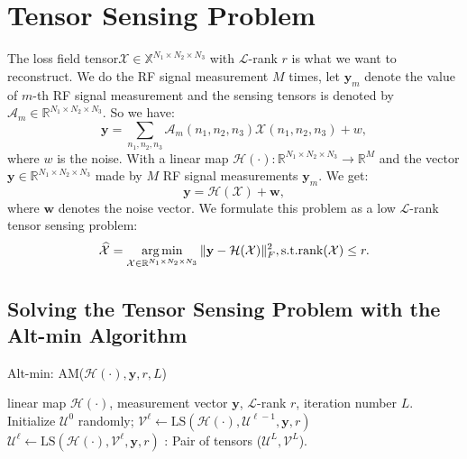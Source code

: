 \documentclass[journal,article,submit,moreauthors,pdftex,10pt,a4paper]{Definitions/mdpi}
\theoremstyle{plain}
\theoremstyle{definition}
\theoremstyle{remark}
\begin{document}
\section{Tensor Sensing Problem}

The loss field tensor$\mathcal{X} \in \mathbb{X}^{N_1 \times N_2 \times N_3}$ with $\mathcal{L}$-rank $r$ is what we want to reconstruct. We do the RF signal measurement $M$ times, let $\mathbf{y}_m$ denote the value of $m$-th RF signal measurement and the sensing tensors is denoted by $\mathcal{A}_m \in \mathbb{R}^{N_1 \times N_2 \times N_3}$. So we have:
\begin{equation}
    \mathbf{y} = \sum\limits_{{n_1,n_2,n_3}}\mathcal{A}_m(n_1,n_2,n_3)\mathcal{X}(n_1, n_2, n_3)+w,
\end{equation}
where $w$ is the noise.
With a linear map $\mathcal{H}(\cdot):\mathbb{R}^{N_1 \times N_2 \times N_3} \to \mathbb{R}^M$\cite{jain2013low} and the vector $\mathbf{y} \in \mathbb{R}^{N_1 \times N_2 \times N_3}$ made by $M$ RF signal measurements $\mathbf{y}_m$\cite{kong2014data}. We get:
\begin{equation}
    \mathbf{y} = \mathcal{H}(\mathcal{X}) + \mathbf{w},
\end{equation}
where $\mathbf{w}$ denotes the noise vector. 
We formulate this problem as a low $\mathcal{L}$-rank tensor sensing problem:
\begin{equation}
    \label{eqa:lstm}
    \widehat{\mathcal{X}} = \mathop{\arg\min}_{\mathcal{X} \in \mathbb{R}^{N_1 \times N_2 \times N_3}}  \| \mathbf{y} - \mathcal{H}(\mathcal{X}) \|_F^2 , \\ 
    \text{s.t.} \text{rank}(\mathcal{X}) \leq r .
\end{equation}

\subsection{Solving the Tensor Sensing Problem with the Alt-min Algorithm}
\begin{algorithm}[htb]
    \caption{Alt-min: AM($\mathcal{H}(\cdot), \mathbf{y}, r, L$)}
    \label{alg:AM}
    \begin{algorithmic}[1]
        \Require
        linear map $\mathcal{H}(\cdot)$, measurement vector $\mathbf{y}$, $\mathcal{L}$-rank $r$, iteration number $L$.
        \State Initialize $\mathcal{U}^0$ randomly;
            \State $\mathcal{V}^{\ell} \gets \text{LS}(\mathcal{H}(\cdot), \mathcal{U}^{\ell -1}, \mathbf{y}, r)$
            \State $\mathcal{U}^{\ell} \gets \text{LS}(\mathcal{H}(\cdot), \mathcal{V}^{\ell}, \mathbf{y}, r)$
            \EndFor
        \Ensure: Pair of tensors ($\mathcal{U}^L, \mathcal{V}^L$).
    \end{algorithmic}
\end{algorithm}
\end{document}

